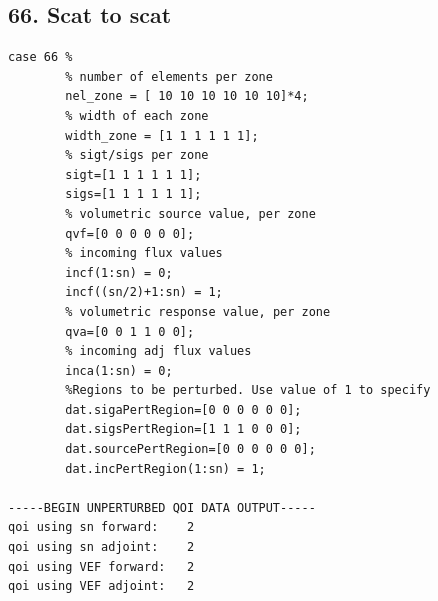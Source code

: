 \documentclass{article}
\begin{document}
\subsection{66. Scat to scat}
\begin{verbatim}
case 66 %
        % number of elements per zone
        nel_zone = [ 10 10 10 10 10 10]*4;
        % width of each zone
        width_zone = [1 1 1 1 1 1];
        % sigt/sigs per zone
        sigt=[1 1 1 1 1 1];
        sigs=[1 1 1 1 1 1];
        % volumetric source value, per zone
        qvf=[0 0 0 0 0 0];
        % incoming flux values
        incf(1:sn) = 0;
        incf((sn/2)+1:sn) = 1;
        % volumetric response value, per zone
        qva=[0 0 1 1 0 0];
        % incoming adj flux values
        inca(1:sn) = 0;
        %Regions to be perturbed. Use value of 1 to specify
        dat.sigaPertRegion=[0 0 0 0 0 0];
        dat.sigsPertRegion=[1 1 1 0 0 0];
        dat.sourcePertRegion=[0 0 0 0 0 0];
        dat.incPertRegion(1:sn) = 1; 
        
-----BEGIN UNPERTURBED QOI DATA OUTPUT----- 
qoi using sn forward: 	 2 
qoi using sn adjoint: 	 2 
qoi using VEF forward: 	 2 
qoi using VEF adjoint: 	 2 
\end{verbatim}
\end{document}
